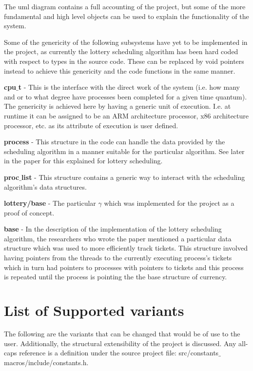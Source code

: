 \documentclass[acmsmall]{acmart}
\newcommand{\csfont}[1]{\fontfamily{cmtt}\selectfont #1}
\begin{document}
\begin{multicols}{2}
    The uml diagram contains a full accounting of the project, but some of the
    more fundamental and high level objects can be used to explain the
    functionality of the system.
    \par
    Some of the  genericity of the following subsystems have yet to be
    implemented in the project, as currently the lottery scheduling algorithm
    has been hard coded with respect to types in the source code.  These can be replaced by void
    pointers instead to achieve this genericity and the code functions in the
    same manner.
    \par
    \textbf{cpu$\_$t} - This is the interface with the direct work of the system
    (i.e. how many and or to what degree have processes been completed for a
    given time quantum). The genericity is achieved here by having a generic
    unit of execution. I.e. at runtime it can be assigned to be an ARM
    architecture processor, x86 architecture processor, etc. as its attribute of
    execution is user defined.
    \par
    \textbf{process} - This structure in the code can handle the data provided
    by the scheduling algorithm in a manner suitable for the particular
    algorithm. See later in the paper for this explained for lottery scheduling.
    \par
    \textbf{proc$\_$list} - This structure contains a generic way to
    interact with the scheduling algorithm's data structures.
    \par
    \textbf{lottery/base} - The particular $\gamma$ which was implemented for
    the project as a proof of concept.
    \par
    \textbf{base} - In the description of the implementation of the lottery
    scheduling algorithm, the researchers who wrote the paper mentioned a
    particular data structure which was used to more efficiently track tickets.
    This structure involved having pointers from the threads to the currently
    executing process's tickets which in turn had pointers to processes with
    pointers to tickets and this process is repeated until the process is
    pointing the the base structure of currency.
    \par

\section{List of Supported variants}
  The following are the variants that can be changed that would be of use to
  the user. Additionally, the structural extensibility of the project is
  discussed. Any all-caps reference is a definition under the source project
  file: {\csfont{src/constants$\_$macros/include/constants.h}}.

\end{multicols}
\end{document}
